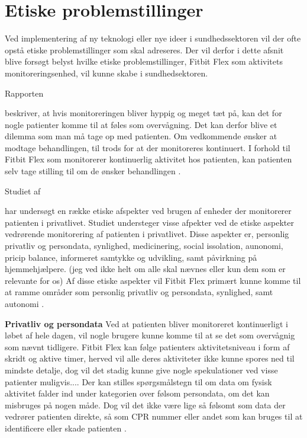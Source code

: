 \section{Etiske problemstillinger}

Ved implementering af ny teknologi eller nye ideer i sundhedssektoren vil der ofte opstå etiske problemstillinger som skal adreseres. Der vil derfor i dette afsnit blive forsøgt belyst hvilke etiske problemstillinger, Fitbit Flex som aktivitets monitoreringsenhed, vil kunne skabe i sundhedsektoren.

Rapporten \author{patienthome2015} beskriver, at hvis monitoreringen bliver hyppig og meget tæt på, kan det for nogle patienter komme til at føles som overvågning. Det kan derfor blive et dilemma som man må tage op med patienten. Om vedkommende ønsker at modtage behandlingen, til trods for at der monitoreres kontinuert. I forhold til Fitbit Flex som monitorerer kontinuerlig aktivitet hos patienten, kan patienten selv tage stilling til om de ønsker behandlingen \citep{patienthome2015}.

Studiet af \author{Mittelstand2011} har undersøgt en række etiske afspekter ved brugen af enheder der monitorerer patienten i privatlivet. Studiet understeger visse afpekter ved de etiske aspekter vedrørende monitorering af patienten i privatlivet. Disse aspekter er, personlig privatliv og persondata, synlighed, medicinering, social issolation, aunonomi, pricip balance, informeret samtykke og udvikling, samt påvirkning på hjemmehjælpere. (jeg ved ikke helt om alle skal nævnes eller kun dem som er relevante for os) 
Af disse etiske aspekter vil Fitbit Flex primært kunne komme til at ramme områder som personlig privatliv og persondata, synlighed, samt autonomi \citep{Mittelstand2011}.

\textbf{Privatliv og persondata}
Ved at patienten bliver monitoreret kontinuerligt i løbet af hele dagen, vil nogle brugere kunne komme til at se det som overvågnig som nævnt tidligere. Fitbit Flex kan følge patienters aktivitetsniveau i form af skridt og aktive timer, herved vil alle deres aktiviteter ikke kunne spores ned til mindste detalje, dog vil det stadig kunne give nogle spekulationer ved visse patienter muligvis....
Der kan stilles spørgsmålstegn til om data om fysisk aktivitet falder ind under kategorien over følsom persondata, om det kan misbruges på nogen måde. Dog vil det ikke være lige så følsomt som data der vedrører patienten direkte, så som CPR nummer eller andet som kan bruges til at identificere eller skade patienten \citep{Mittelstand2011}.

